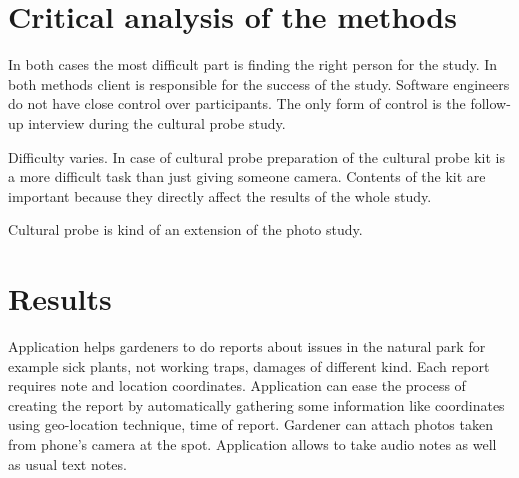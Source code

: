 \documentclass[12pt, a4paper]{article}
\begin{document}
\section{Critical analysis of the methods}

In both cases the most difficult part is finding the right person for the study. In both methods client is responsible for the success of the study. Software engineers do not have close control over participants. The only form of control is the follow-up interview during the cultural probe study. 

Difficulty varies. In case of cultural probe preparation of the cultural probe kit is a more difficult task than just giving someone camera. Contents of the kit are important because they directly affect the results of the whole study. 

Cultural probe is kind of an extension of the photo study.

\section{Results}
Application helps gardeners to do reports about issues in the natural park for example sick plants, not working traps, damages of different kind. Each report requires note and location coordinates. Application can ease the process of creating the report by automatically gathering some information like coordinates using geo-location technique, time of report. Gardener can attach photos taken from phone's camera at the spot. Application allows to take audio notes as well as usual text notes.

\nocite{*}


\end{document}
